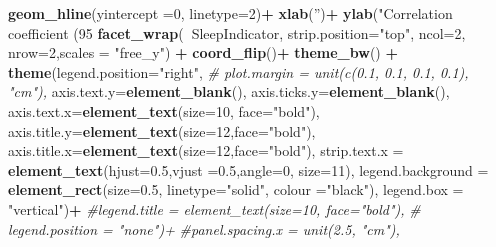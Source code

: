 \documentclass[
]{book}
\newenvironment{Shaded}{\begin{snugshade}}{\end{snugshade}}
\newcommand{\CommentTok}[1]{\textcolor[rgb]{0.56,0.35,0.01}{\textit{#1}}}
\newcommand{\DataTypeTok}[1]{\textcolor[rgb]{0.13,0.29,0.53}{#1}}
\newcommand{\DecValTok}[1]{\textcolor[rgb]{0.00,0.00,0.81}{#1}}
\newcommand{\FloatTok}[1]{\textcolor[rgb]{0.00,0.00,0.81}{#1}}
\newcommand{\KeywordTok}[1]{\textcolor[rgb]{0.13,0.29,0.53}{\textbf{#1}}}
\newcommand{\NormalTok}[1]{#1}
\newcommand{\OperatorTok}[1]{\textcolor[rgb]{0.81,0.36,0.00}{\textbf{#1}}}
\newcommand{\StringTok}[1]{\textcolor[rgb]{0.31,0.60,0.02}{#1}}
\begin{document}
\begin{Shaded}
\begin{Highlighting}[]
\StringTok{  }\KeywordTok{geom_hline}\NormalTok{(}\DataTypeTok{yintercept =}\DecValTok{0}\NormalTok{, }\DataTypeTok{linetype=}\DecValTok{2}\NormalTok{)}\OperatorTok{+}
\StringTok{  }\KeywordTok{xlab}\NormalTok{(}\StringTok{''}\NormalTok{)}\OperatorTok{+}\StringTok{ }\KeywordTok{ylab}\NormalTok{(}\StringTok{"Correlation coefficient (95% Confidence Interval)"}\NormalTok{)}\OperatorTok{+}
\StringTok{  }\KeywordTok{facet_wrap}\NormalTok{(}\OperatorTok{~}\NormalTok{SleepIndicator,}
               \DataTypeTok{strip.position=}\StringTok{"top"}\NormalTok{,}
               \DataTypeTok{ncol=}\DecValTok{2}\NormalTok{, }\DataTypeTok{nrow=}\DecValTok{2}\NormalTok{,}\DataTypeTok{scales =} \StringTok{"free_y"}\NormalTok{) }\OperatorTok{+}
\StringTok{  }\KeywordTok{coord_flip}\NormalTok{()}\OperatorTok{+}
\StringTok{  }\KeywordTok{theme_bw}\NormalTok{() }\OperatorTok{+}
\StringTok{  }\KeywordTok{theme}\NormalTok{(}\DataTypeTok{legend.position=}\StringTok{"right"}\NormalTok{,}
        \CommentTok{# plot.margin = unit(c(0.1, 0.1, 0.1, 0.1), "cm"),}
          \DataTypeTok{axis.text.y=}\KeywordTok{element_blank}\NormalTok{(),}
          \DataTypeTok{axis.ticks.y=}\KeywordTok{element_blank}\NormalTok{(),}
          \DataTypeTok{axis.text.x=}\KeywordTok{element_text}\NormalTok{(}\DataTypeTok{size=}\DecValTok{10}\NormalTok{, }\DataTypeTok{face=}\StringTok{"bold"}\NormalTok{),}
          \DataTypeTok{axis.title.y=}\KeywordTok{element_text}\NormalTok{(}\DataTypeTok{size=}\DecValTok{12}\NormalTok{,}\DataTypeTok{face=}\StringTok{"bold"}\NormalTok{),}
          \DataTypeTok{axis.title.x=}\KeywordTok{element_text}\NormalTok{(}\DataTypeTok{size=}\DecValTok{12}\NormalTok{,}\DataTypeTok{face=}\StringTok{"bold"}\NormalTok{),}
          \DataTypeTok{strip.text.x =} \KeywordTok{element_text}\NormalTok{(}\DataTypeTok{hjust=}\FloatTok{0.5}\NormalTok{,}\DataTypeTok{vjust =}\FloatTok{0.5}\NormalTok{,}\DataTypeTok{angle=}\DecValTok{0}\NormalTok{,}
                                      \DataTypeTok{size=}\DecValTok{11}\NormalTok{),}
          \DataTypeTok{legend.background =} \KeywordTok{element_rect}\NormalTok{(}\DataTypeTok{size=}\FloatTok{0.5}\NormalTok{, }\DataTypeTok{linetype=}\StringTok{"solid"}\NormalTok{, }
                                  \DataTypeTok{colour =}\StringTok{"black"}\NormalTok{),}
        \DataTypeTok{legend.box =} \StringTok{"vertical"}\NormalTok{)}\OperatorTok{+}
\StringTok{        }\CommentTok{#legend.title = element_text(size=10, face="bold"),}
\StringTok{        }\CommentTok{# legend.position = "none")+}
\StringTok{        }\CommentTok{#panel.spacing.x = unit(2.5, "cm"),}
}
\end{Highlighting}
\end{Shaded}
\end{document}
